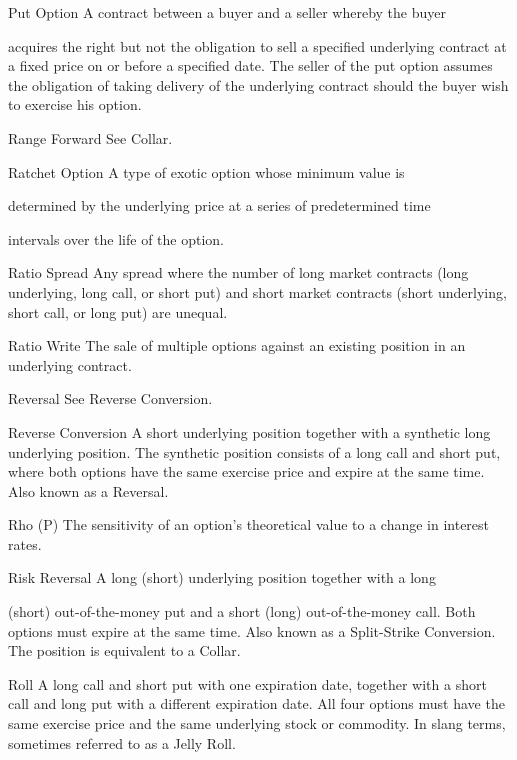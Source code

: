 Put Option A contract between a buyer and a seller whereby the buyer\par
acquires the right but not the obligation to sell a specified underlying contract at a fixed price on or before a specified date. The seller of the put option assumes the obligation of taking delivery of the underlying contract should the buyer wish to exercise his option.\par
Range Forward See Collar.\par
Ratchet Option A type  of  exotic  option whose minimum  value  is\par
determined by the underlying price  at a series of predetermined time\par
intervals over the life of the option.\par
Ratio Spread Any spread where the number of long market contracts (long underlying, long call, or short put) and short market contracts (short underlying, short call, or long put) are unequal.\par
Ratio Write The sale of multiple options against an existing position in an underlying contract.\par
Reversal See Reverse Conversion.\par
Reverse Conversion A short underlying position together with a synthetic long underlying position. The synthetic position consists of a long call and short put, where both options have the same exercise price and expire at the same time. Also known as a Reversal.\par
Rho (P) The sensitivity of an option's theoretical value to a change in interest rates.\par
Risk Reversal A long (short) underlying position together with a long\par
(short) out-of-the-money put and a short (long) out-of-the-money call. Both options must expire at the same time. Also known as a Split-Strike Conversion. The position is equivalent to a Collar.\par
Roll A long call and short put with one expiration date, together with a short call and long put with a different expiration date. All four options must have the same exercise price and the same underlying stock or commodity. In slang terms, sometimes referred to as a Jelly Roll.\par

